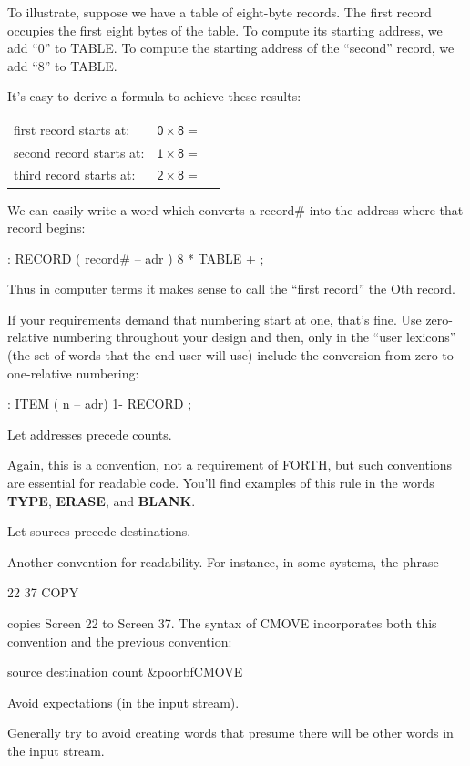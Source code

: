 To illustrate, suppose we have a table of eight-byte records. The
first record occupies the first eight bytes of the table. To compute its
starting address, we add ``0'' to TABLE. To compute the starting address
of the ``second'' record, we add ``8'' to TABLE.



It's easy to derive a formula to achieve these results:

\bigskip
\begin{tabular}{@{}l@{ }l@{}r}
\sf first record starts at:  &  $\mathsf{0 \times 8} = {}$ & \sf 0  \\
\sf second record starts at: &  $\mathsf{1 \times 8} = {}$ & \sf 8  \\
\sf third record starts at:  &  $\mathsf{2 \times 8} = {}$ & \sf 16 \\
\end{tabular}
\bigskip

We can easily write a word which converts a record\# into the address
where that record begins:

\begin{Code}
: RECORD  ( record# -- adr )
   8 *  TABLE + ;
\end{Code}

Thus in computer terms it makes sense to call the ``first record'' the Oth
record.

If your requirements demand that numbering start at one, that's
fine. Use zero-relative numbering throughout your design and then, only
in the ``user lexicons'' (the set of words that the end-user will use)
include the conversion from zero-to one-relative numbering:
\begin{Code}
: ITEM  ( n -- adr)  1- RECORD ;
\end{Code}
\begin{tip}
Let addresses precede counts.
\end{tip}
Again, this is a convention, not a requirement of FORTH, but such conventions
are essential for readable code. You'll find examples of this rule
in the words \textbf{TYPE}, \textbf{ERASE}, and \textbf{BLANK}.
\begin{tip}
Let sources precede destinations.
\end{tip}
Another convention for readability. For instance, in some systems, the
phrase
\begin{Code}
22 37 COPY
\end{Code}
copies Screen 22 to Screen 37. The syntax of CMOVE incorporates both
this convention and the previous convention:
\begin{Code}[commandchars=\&\{\}]
source destination count &poorbf{CMOVE}
\end{Code}
\begin{tip}
Avoid expectations (in the input stream).
\end{tip}
Generally try to avoid creating words that presume there will be other
words in the input stream.

